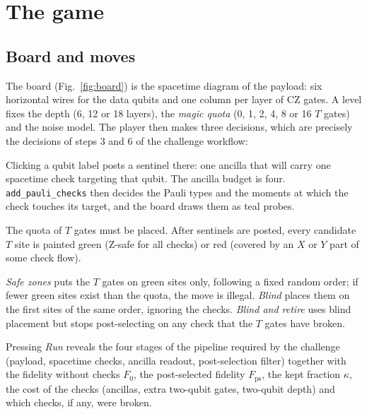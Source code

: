 \section{The game}
\label{sec:game}

\subsection{Board and moves}
The board (Fig.~\ref{fig:board}) is the spacetime diagram of the payload: six horizontal wires for the data qubits and one column per layer of CZ gates. A level fixes the depth (6, 12 or 18 layers), the \emph{magic quota} (0, 1, 2, 4, 8 or 16 $T$ gates) and the noise model. The player then makes three decisions, which are precisely the decisions of steps 3 and 6 of the challenge workflow:

\begin{description}[leftmargin=1.2em,itemsep=2pt]
  \item[Post sentinels.] Clicking a qubit label posts a sentinel there: one ancilla that will carry one spacetime check targeting that qubit. The ancilla budget is four. \texttt{add\_pauli\_checks} then decides the Pauli types and the moments at which the check touches its target, and the board draws them as teal probes.
  \item[Inject magic.] The quota of $T$ gates must be placed. After sentinels are posted, every candidate $T$ site is painted green (Z-safe for all checks) or red (covered by an $X$ or $Y$ part of some check flow).
  \item[Choose a placement policy.] \emph{Safe zones} puts the $T$ gates on green sites only, following a fixed random order; if fewer green sites exist than the quota, the move is illegal. \emph{Blind} places them on the first sites of the same order, ignoring the checks. \emph{Blind and retire} uses blind placement but stops post-selecting on any check that the $T$ gates have broken.
\end{description}
\noindent Pressing \emph{Run} reveals the four stages of the pipeline required by the challenge (payload, spacetime checks, ancilla readout, post-selection filter) together with the fidelity without checks $F_0$, the post-selected fidelity $F_{\mathrm{ps}}$, the kept fraction $\kappa$, the cost of the checks (ancillas, extra two-qubit gates, two-qubit depth) and which checks, if any, were broken.

